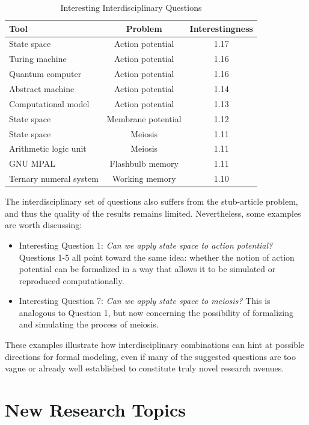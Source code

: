 \begin{table}
\begin{centering}
\begin{tabular}{|l|c|c|}
\hline 
{Tool} & Problem & Interestingness\tabularnewline
\hline 
\hline 
State space & Action potential & 1.17\tabularnewline
\hline 
{Turing machine} & Action potential & 1.16\tabularnewline
\hline 
Quantum computer & Action potential & 1.16\tabularnewline
\hline 
Abstract machine & Action potential & 1.14\tabularnewline
\hline 
Computational model & Action potential & 1.13\tabularnewline
\hline 
State space & Membrane potential & 1.12\tabularnewline
\hline 
State space & Meiosis & 1.11\tabularnewline
\hline 
Arithmetic logic unit & Meiosis & 1.11\tabularnewline
\hline 
GNU MPAL & Flashbulb memory & 1.11\tabularnewline
\hline 
Ternary numeral system & Working memory & 1.10\tabularnewline
\hline 
\end{tabular}
\par\end{centering}

\caption{\label{tab:Interesting-Intradisciplinary-Questions-1-1}Interesting
Interdisciplinary Questions}
\end{table}

The interdisciplinary set of questions also suffers from the stub-article problem, and thus the quality of the results remains limited. Nevertheless, some examples are worth discussing:
\begin{itemize}
\item Interesting Question 1: \emph{Can we apply state space to action potential?} Questions 1-5 all point toward the same idea: whether the notion of action potential can be formalized in a way that allows it to be simulated or reproduced computationally.
\item Interesting Question 7: \emph{Can we apply state space to meiosis?} This is analogous to Question 1, but now concerning the possibility of formalizing and simulating the process of meiosis.
\end{itemize}
These examples illustrate how interdisciplinary combinations can hint at possible directions for formal modeling, even if many of the suggested questions are too vague or already well established to constitute truly novel research avenues.


%
%
\section{New Research Topics}
\label{sec:New_Research_Topics}

